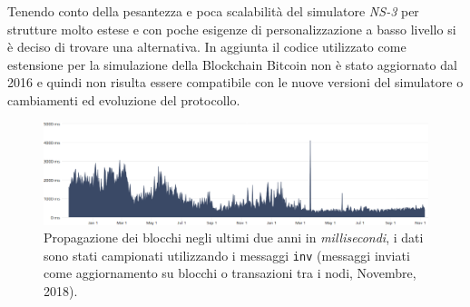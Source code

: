 Tenendo conto della pesantezza e poca scalabilità del simulatore \textit{NS-3} per strutture molto estese e con poche esigenze di personalizzazione a basso livello si è deciso di trovare una alternativa. In aggiunta il codice utilizzato come estensione per la simulazione della Blockchain Bitcoin non è stato aggiornato dal 2016 e quindi non risulta essere compatibile con le nuove versioni del simulatore o cambiamenti ed evoluzione del protocollo.\newline
\begin{figure}[H]
    \includegraphics[width=\textwidth]{images/blocks_propagation.png}
    \caption{Propagazione dei blocchi negli ultimi due anni in \textit{millisecondi}, i dati sono stati campionati utilizzando i messaggi \texttt{inv} (messaggi inviati come aggiornamento su blocchi o transazioni tra i nodi, Novembre, 2018).}
\end{figure}


